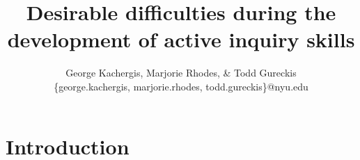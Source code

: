 \documentclass[man,floatsintext]{apa6}
\title{Desirable difficulties during the development of active inquiry skills}
\author{
 George Kachergis, Marjorie Rhodes, \& Todd Gureckis \\
  \{george.kachergis, marjorie.rhodes, todd.gureckis\}@nyu.edu
}
\affiliation{Department of Psychology, New York University \\
  New York, NY}
\begin{document}
\maketitle
\section{Introduction} 

%
%
%
\end{document}
